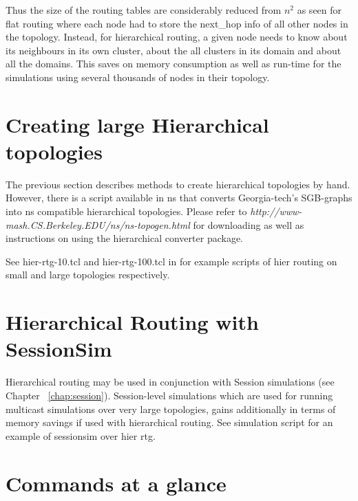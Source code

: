 Thus the size of the routing tables are considerably reduced from 
$n^{2}$ as seen for flat routing where each node had to store the
  next\_hop info of all other nodes in the topology. Instead, for
  hierarchical routing, a given node needs to know about its neighbours
  in its own cluster, about the all clusters in its domain and about all
  the domains. This saves on memory consumption as well as run-time for
  the simulations using several thousands of nodes in their topology.


\section{Creating large Hierarchical topologies}
\label{large-hier-topo}
The previous section describes methods to create hierarchical topologies
by hand. However, there is a script available in ns that converts
Georgia-tech's SGB-graphs into ns compatible hierarchical topologies.
Please refer to {\em http://www-mash.CS.Berkeley.EDU/ns/ns-topogen.html}
for downloading as well as instructions on using the hierarchical
converter package. 

See hier-rtg-10.tcl and hier-rtg-100.tcl in  for example
scripts of hier routing on small and large topologies
respectively. 


\section{Hierarchical Routing with SessionSim}
\label{sec:hier-rtg-with-sessionsim}

Hierarchical routing may be used in conjunction with Session simulations
(see Chapter ~\ref{chap:session}). Session-level simulations which are used
for running multicast simulations over very large topologies, gains
additionally in terms of memory savings if used with hierarchical
routing. See simulation script 
for an example of sessionsim over hier rtg.


\section{Commands at a glance}

